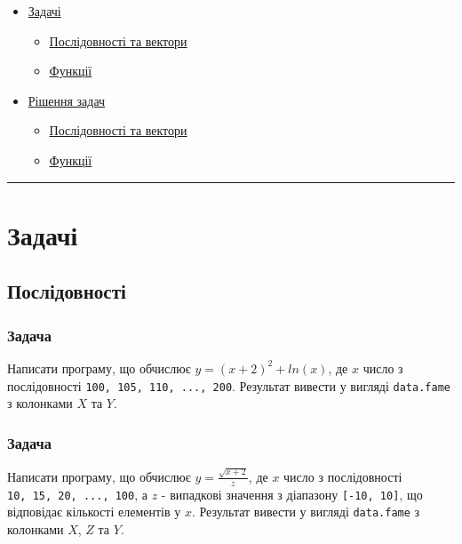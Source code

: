 \documentclass[
]{book}
\providecommand{\tightlist}{%
  \setlength{\itemsep}{0pt}\setlength{\parskip}{0pt}}
\begin{document}
\begin{itemize}
\tightlist
\item
  \protect\hyperlink{chapter61}{Задачі}

  \begin{itemize}
  \tightlist
  \item
    \protect\hyperlink{chapter611}{Послідовності та вектори}
  \item
    \protect\hyperlink{chapter612}{Функції}
  \end{itemize}
\item
  \protect\hyperlink{chapter62}{Рішення задач}

  \begin{itemize}
  \tightlist
  \item
    \protect\hyperlink{chapter621}{Послідовності та вектори}
  \item
    \protect\hyperlink{chapter622}{Функції}
  \end{itemize}
\end{itemize}

\begin{center}\rule{0.5\linewidth}{0.5pt}\end{center}

\hypertarget{chapter61}{%
\section{Задачі}\label{chapter61}}

\hypertarget{chapter611}{%
\subsection{Послідовності}\label{chapter611}}

\hypertarget{task6111}{%
\subsubsection{Задача}\label{task6111}}

Написати програму, що обчислює \(y = (x+2)^2 + ln(x)\), де \(x\) число з послідовності \texttt{100,\ 105,\ 110,\ ...,\ 200}. Результат вивести у вигляді \texttt{data.fame} з колонками \(X\) та \(Y\).

\hypertarget{task6112}{%
\subsubsection{Задача}\label{task6112}}

Написати програму, що обчислює \(y = \frac{\sqrt{x+2}}{z}\), де \(x\) число з послідовності \texttt{10,\ 15,\ 20,\ ...,\ 100}, а \(z\) - випадкові значення з діапазону \texttt{{[}-10,\ 10{]}}, що відповідає кількості елементів у \(x\). Результат вивести у вигляді \texttt{data.fame} з колонками \(X\), \(Z\) та \(Y\).
\end{document}
